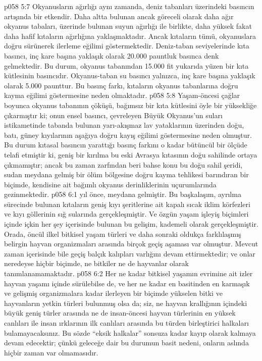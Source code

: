 \vs p058 5:7 Okyanusların ağırlığı aynı zamanda, deniz tabanları üzerindeki basıncın artışında bir etkendir. Daha altta bulunan ancak göreceli olarak daha ağır okyanus tabaları, üzerinde bulunan suyun ağırlığı ile birlikte, daha yüksek fakat daha hafif kıtaların ağırlığına yaklaşmaktadır. Ancak kıtaların tümü, okyanuslara doğru sürünerek ilerleme eğilimi göstermektedir. Deniz\hyp{}taban seviyelerinde kıta basıncı, inç kare başına yaklaşık olarak 20.000 pauntluk basınca denk gelmektedir. Bu durum, okyanus tabanından 15.000 fit yukarıda yüzen bir kıta kütlesinin basıncıdır. Okyanus\hyp{}taban su basıncı yalnızca, inç kare başına yaklaşık olarak 5.000 paunttur. Bu basınç farkı, kıtaların okyanus tabanlarına doğru kayma eğilimi göstermesine neden olmaktadır.
\vs p058 5:8 Yaşam\hyp{}öncesi çağlar boyunca okyanus tabanının çöküşü, bağımsız bir kıta kütlesini öyle bir yüksekliğe çıkarmıştır ki; onun ensel basıncı, çevreleyen Büyük Okyanus’un suları istikametinde tabanda bulunan yarı\hyp{}akışmaz lav yataklarının üzerinden doğu, batı, güney kıyılarının aşağıya doğru kayış eğilimi göstermesine neden olmuştur. Bu durum kıtasal basıncın yarattığı basınç farkını o kadar bütüncül bir ölçüde telafi etmiştir ki, geniş bir kırılma bu eski Avrasya kıtasının doğu sahilinde ortaya çıkmamıştır; ancak bu zaman zarfından beri bahse konu bu doğu sahil şeridi, sudan meydana gelmiş bir ölüm bölgesine doğru kayma tehlikesi barındıran bir biçimde, kendisine ait bağımlı okyanus derinliklerinin uçurumlarında gezinmektedir.
\vs p058 6:1  yıl önce,  meydana gelmiştir. Bu başkalaşım, ayrılma sürecinde bulunan kıtaların geniş kıyı şeritlerine ait kapalı sıcak iklim körfezleri ve kıyı göllerinin sığ sularında gerçekleşmiştir. Ve özgün yaşam işleyiş biçimleri içinde içkin her şey içerisinde bulunan bu gelişim, kademeli olarak gerçekleşmiştir. Orada, öncül ilkel bitkisel yaşam türleri ve daha sonraki oldukça farklılaşmış belirgin hayvan organizmaları arasında birçok geçiş aşaması var olmuştur. Mevcut zaman içerisinde bile geçiş balçık kalıpları varlığını devam ettirmektedir; ve onlar neredeyse hiçbir biçimde, ne bitkiler ne de hayvanlar olarak tanımlanamamaktadır.
\vs p058 6:2 Her ne kadar bitkisel yaşamın evrimine ait izler hayvan yaşamı içinde sürülebilse de, ve her ne kadar en basitinden en karmaşık ve gelişmiş organizmalara kadar ilerleyen bir biçimde yükselen bitki ve hayvanların yetkin türleri bulunmuş olsa da; siz, ne hayvan krallığının içindeki büyük geniş türler arasında ne de insan\hyp{}öncesi hayvan türlerinin en yüksek canlıları ile insan ırklarının ilk canlıları arasında bu türden birleştirici halkaları bulamayacaksınız. Bu sözde “eksik halkalar” sonsuza kadar kayıp olarak kalmaya devam edecektir; çünkü geleceğe dair bu durumun basit nedeni, onların aslında hiçbir zaman var olmamasıdır.
